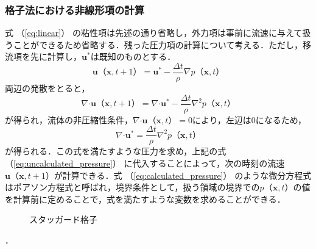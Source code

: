 \documentclass[a4j,12pt]{jreport}
\begin{document}
\subsubsection{格子法における非線形項の計算} \label{subsec:gridpressure}
式 （\ref{eq:linear}） の粘性項は先述の通り省略し，外力項は事前に流速に与えて扱うことができるため省略する．残った圧力項の計算について考える．ただし，移流項を先に計算し，$\bm{u}^*$は既知のものとする．
\begin{equation}\label{eq:uncalculated_pressure}
\bm{u} （\bm{x},t+1）  =  \bm{u}^* - \frac{\varDelta t}{\rho}\nabla p （\bm{x},t） 
\end{equation} 
両辺の発散をとると，
$$\nabla\boldsymbol{\cdot}\bm{u} （\bm{x},t+1）  =  \nabla\boldsymbol{\cdot}\bm{u}^* - \frac{\varDelta t}{\rho}\nabla^2 p （\bm{x},t） $$
が得られ，流体の非圧縮性条件，$\nabla\boldsymbol{\cdot}\bm{u} （\bm{x},t）  = 0$により，左辺は0になるため，
\begin{equation}\label{eq:calculated_pressure}
\nabla\boldsymbol{\cdot}\bm{u}^* = \frac{\varDelta t}{\rho}\nabla^2 p （\bm{x},t） 
\end{equation} 
が得られる．この式を満たすような圧力を求め，上記の式 （\ref{eq:uncalculated_pressure}） に代入することによって，次の時刻の流速$\bm{u} （\bm{x},t+1） $が計算できる．式 （\ref{eq:calculated_pressure}） のような微分方程式はポアソン方程式と呼ばれ，境界条件として，扱う領域の境界での$p （\bm{x},t） $の値を計算前に定めることで，式を満たすような変数を求めることができる．
\begin{figure}[htbp]
\begin{center}
\caption{スタッガード格子}
\label{fig:staggerd}
\end{center}
\end{figure}．
\end{document}
